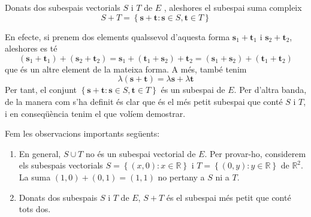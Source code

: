 \begin{teorema}
Donats dos subespais vectorials $S$ i $T$ de $E$%
, aleshores el subespai suma compleix%
\begin{equation*}
S+T=\left\{ \mathbf{s}+\mathbf{t}:\mathbf{s}\in S,%
\mathbf{t}\in T\right\}
\end{equation*}

\end{teorema}
\begin{prova}
En efecte, si prenem dos elements qualssevol d’aquesta forma $\mathbf{s}%
_{1}+\mathbf{t}_{1}$ i $\mathbf{s}_{2}+\mathbf{t}_{2}$, aleshores es té 
\begin{equation*}
(\mathbf{s}_{1}+\mathbf{t}_{1})+(\mathbf{s}_{2}+\mathbf{t}_{2})=\mathbf{s}%
_{1}+(\mathbf{t}_{1}+\mathbf{s}_{2})+\mathbf{t}_{2}=(\mathbf{s}_{1}+\mathbf{s%
}_{2})+(\mathbf{t}_{1}+\mathbf{t}_{2})
\end{equation*}%
que és un altre element de la mateixa forma. A més, també tenim 
\begin{equation*}
\lambda (\mathbf{s}+\mathbf{t})=\lambda \mathbf{s}+\lambda \mathbf{t}
\end{equation*}%
Per tant, el conjunt $\left\{ \mathbf{s}+\mathbf{t}:\mathbf{s}\in S,\mathbf{t}\in T\right\} $ és un subespai de $E$. Per
d’altra banda, de la manera com s'ha definit és clar que és el més petit
subespai que conté $S$ i $T$, i en conseqüència
tenim el que volíem demostrar.
\end{prova}

\begin{observacio}
Fem les observacions importants següents:

\begin{enumerate}
\item En general, $S\cup T$ no és un subespai vectorial de $E$.
Per provar-ho, considerem els subespais vectorials $S=\left\{
(x,0):x\in \mathbb{R}\right\} $ i $T=\left\{ (0,y):y\in \mathbb{R}%
\right\} $ de $\mathbb{R}^{2}$. La suma $(1,0)+(0,1)=(1,1)$ no pertany a $%
S$ ni a $T$.

\item Donats dos subespais $S$ i $T$ de $E$, $%
S+T$ és el subespai més petit que conté tots dos.
\end{enumerate}
\end{observacio}

